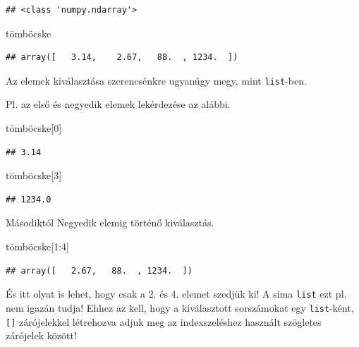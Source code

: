 \documentclass[
]{book}
\newenvironment{Shaded}{\begin{snugshade}}{\end{snugshade}}
\newcommand{\DecValTok}[1]{\textcolor[rgb]{0.00,0.00,0.81}{#1}}
\newcommand{\NormalTok}[1]{#1}
\begin{document}
\begin{verbatim}
## <class 'numpy.ndarray'>
\end{verbatim}

\begin{Shaded}
\begin{Highlighting}[]
\NormalTok{tömböcske}
\end{Highlighting}
\end{Shaded}

\begin{verbatim}
## array([   3.14,    2.67,   88.  , 1234.  ])
\end{verbatim}

Az elemek kiválasztása szerencsénkre ugyanúgy megy, mint \texttt{list}-ben.

Pl. az első és negyedik elemek lekérdezése az alábbi.

\begin{Shaded}
\begin{Highlighting}[]
\NormalTok{tömböcske[}\DecValTok{0}\NormalTok{]}
\end{Highlighting}
\end{Shaded}

\begin{verbatim}
## 3.14
\end{verbatim}

\begin{Shaded}
\begin{Highlighting}[]
\NormalTok{tömböcske[}\DecValTok{3}\NormalTok{]}
\end{Highlighting}
\end{Shaded}

\begin{verbatim}
## 1234.0
\end{verbatim}

Másodiktól Negyedik elemig történő kiválasztás.

\begin{Shaded}
\begin{Highlighting}[]
\NormalTok{tömböcske[}\DecValTok{1}\NormalTok{:}\DecValTok{4}\NormalTok{]}
\end{Highlighting}
\end{Shaded}

\begin{verbatim}
## array([   2.67,   88.  , 1234.  ])
\end{verbatim}

És itt olyat is lehet, hogy csak a 2. és 4. elemet szedjük ki! A sima \texttt{list} ezt pl. nem igazán tudja! Ehhez az kell, hogy a kiválasztott sorszámokat egy \texttt{list}-ként, \texttt{{[}{]}} zárójelekkel létrehozva adjuk meg az indexszeléshez használt szögletes zárójelek között!
\end{document}
